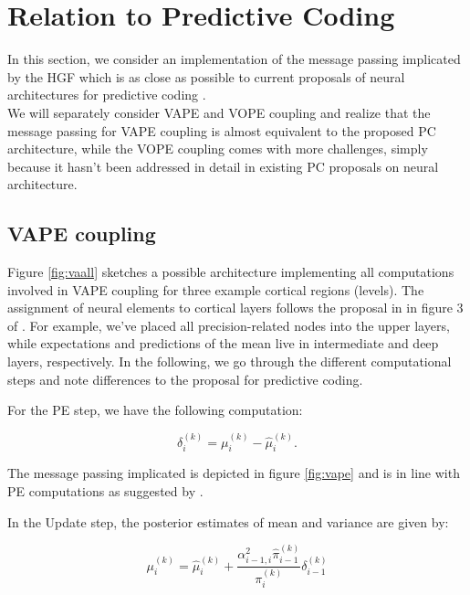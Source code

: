 \section{Relation to Predictive Coding}

In this section, we consider an implementation of the message passing implicated by the HGF which is as close as possible to current proposals of neural architectures for predictive coding \cite{Shipp2016}.\\

We will separately consider \textsf{VAPE} and \textsf{VOPE} coupling and realize that the message passing for \textsf{VAPE} coupling is almost equivalent to the proposed PC architecture, while the \textsf{VOPE} coupling comes with more challenges, simply because it hasn't been addressed in detail in existing PC proposals on neural architecture.


\subsection{VAPE coupling}

Figure \ref{fig:vaall} sketches a possible architecture implementing all computations involved in \textsf{VAPE} coupling for three example cortical regions (levels). The assignment of neural elements to cortical layers follows the proposal in in figure 3 of \cite{Shipp2016}. For example, we've placed all precision-related nodes into the upper layers, while expectations and predictions of the mean live in intermediate and deep layers, respectively. In the following, we go through the different computational steps and note differences to the proposal for predictive coding.

For the \textsf{PE} step, we have the following computation:

\begin{equation}
	\delta_i^{(k)} = \mu_i^{(k)} - \hat{\mu}_i^{(k)}.
\end{equation}


The message passing implicated is depicted in figure \ref{fig:vape} and is in line with PE computations as suggested by \cite{Shipp2016}.

In the \textsf{Update} step, the posterior estimates of mean and variance are given by:

\begin{equation}
	\mu_i^{(k)} = \hat{\mu}_i^{(k)} + \frac{\alpha_{i-1,i}^2 \hat{\pi}_{i-1}^{(k)}}{\pi_i^{(k)}} \delta_{i-1}^{(k)}
\end{equation}

